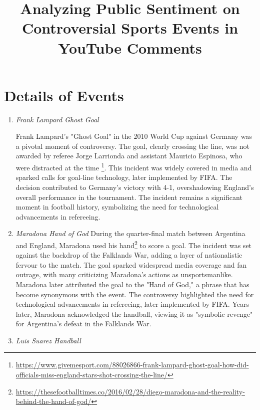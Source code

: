 \documentclass{article}
\title{Analyzing Public Sentiment on Controversial Sports Events in YouTube Comments}
\date{}
\begin{document}
\maketitle

\section{Details of Events}

\begin{enumerate}
    \item \textit{Frank Lampard Ghost Goal}

Frank Lampard's "Ghost Goal" in the 2010 World Cup against Germany was a pivotal moment of controversy. The goal, clearly crossing the line, was not awarded by referee Jorge Larrionda and assistant Mauricio Espinosa, who were distracted at the time \footnote{\url{https://www.givemesport.com/88026866-frank-lampard-ghost-goal-how-did-officials-miss-england-stars-shot-crossing-the-line/}}. This incident was widely covered in media and sparked calls for goal-line technology, later implemented by FIFA. The decision contributed to Germany's victory with 4-1, overshadowing England's overall performance in the tournament. The incident remains a significant moment in football history, symbolizing the need for technological advancements in refereeing.

\item \textit{Maradona Hand of God}
During the quarter-final match between Argentina and England, Maradona used his hand\footnote{\url{https://thesefootballtimes.co/2016/02/28/diego-maradona-and-the-reality-behind-the-hand-of-god/}} to score a goal. The incident was set against the backdrop of the Falklands War, adding a layer of nationalistic fervour to the match. The goal sparked widespread media coverage and fan outrage, with many criticizing Maradona's actions as unsportsmanlike. Maradona later attributed the goal to the "Hand of God," a phrase that has become synonymous with the event. The controversy highlighted the need for technological advancements in refereeing, later implemented by FIFA. Years later, Maradona acknowledged the handball, viewing it as "symbolic revenge" for Argentina's defeat in the Falklands War.


\item \textit{Luis Suarez Handball}


\end{enumerate}
\end{document}

